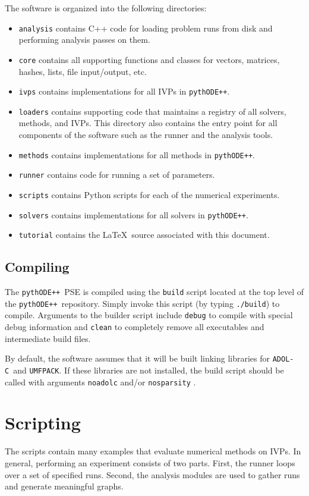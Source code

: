 \documentclass[11pt]{article}
\newcommand{\pypp}{\texttt{pythODE++}}
\newcommand{\adolc}{\texttt{ADOL-C}}
\newcommand{\umfpack}{\texttt{UMFPACK}}
\begin{document}
The software is organized into the following directories:
\begin{itemize}
\item \verb=analysis= contains C++ code for loading problem runs from disk and performing analysis passes on them.
\item \verb=core= contains all supporting functions and classes for vectors, matrices, hashes, lists, file input/output, etc.
\item \verb=ivps= contains implementations for all \acp{IVP} in \pypp.
\item \verb=loaders= contains supporting code that maintains a registry of all solvers, methods, and IVPs. This directory also contains the entry point for all components of the software such as the runner and the analysis tools.
\item \verb=methods= contains implementations for all methods in \pypp.
\item \verb=runner= contains code for running a set of parameters.
\item \verb=scripts= contains Python scripts for each of the numerical experiments.
\item \verb=solvers= contains implementations for all solvers in \pypp.
\item \verb=tutorial= contains the \LaTeX\ source associated with this document.
\end{itemize}

\subsection{Compiling}

The \pypp\ PSE is compiled using the \verb=build= script located at the top level of the \pypp\ repository. Simply invoke this script (by typing \verb=./build=) to compile. Arguments to the builder script include \verb=debug= to compile with special debug information and \verb=clean= to completely remove all executables and intermediate build files.

By default, the software assumes that it will be built linking libraries for \adolc\ and \umfpack. If these libraries are not installed, the build script should be called with arguments \verb=noadolc= and/or \verb=nosparsity= .

\section{Scripting}

The scripts contain many examples that evaluate numerical methods on
IVPs. In general, performing an experiment consists of two
parts. First, the runner loops over a set of specified runs. Second,
the analysis modules are used to gather runs and generate
meaningful graphs.
\end{document}
